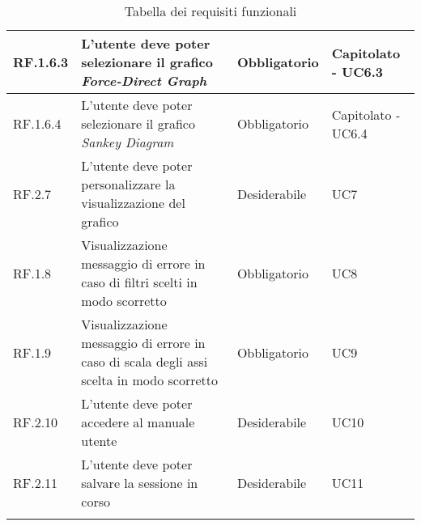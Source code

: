 \begin{center}
\begin{longtable}{|L{1,5cm}|C{5,5cm}|C{3cm}|C{2cm}|}
    RF.1.6.3 & L'utente deve poter selezionare il grafico \textit{Force-Direct Graph} & Obbligatorio & Capitolato - UC6.3 \\ \hline
    RF.1.6.4 & L'utente deve poter selezionare il grafico \textit{Sankey Diagram} & Obbligatorio & Capitolato - UC6.4 \\ \hline
    RF.2.7 & L'utente deve poter personalizzare la visualizzazione del grafico & Desiderabile & UC7 \\ \hline
    RF.1.8 & Visualizzazione messaggio di errore in caso di filtri scelti in modo scorretto & Obbligatorio & UC8 \\ \hline
    RF.1.9 & Visualizzazione messaggio di errore in caso di scala degli assi scelta in modo scorretto & Obbligatorio & UC9 \\ \hline
    RF.2.10 & L'utente deve poter accedere al manuale utente & Desiderabile & UC10 \\ \hline
    RF.2.11 & L'utente deve poter salvare la sessione in corso & Desiderabile & UC11 \\ \hline

    \caption{Tabella dei requisiti funzionali}
  \end{longtable}
\end{center}

